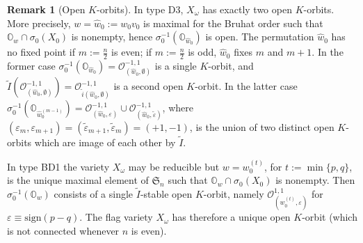 \documentclass{amsart}
\theoremstyle{definition}
\newtheorem{remark}{Remark}
\begin{document}
\begin{remark}[Open $K$-orbits]
In type D3, 
$X_\omega$ has exactly two open $K$-orbits.
More precisely, $w=\hat{w}_0:=w_0v_0$
is maximal for the Bruhat order such that $\mathbb{O}_w\cap\sigma_0(X_0)$ is nonempty,
hence $\sigma_0^{-1}(\mathbb{O}_{\hat{w}_0})$ is open.
The permutation $\hat{w}_0$ has no fixed point if $m:=\frac{n}{2}$ is even; if $m:=\frac{n}{2}$ is odd, $\hat{w}_0$ fixes $m$ and $m+1$.
In the former case
$\sigma_0^{-1}(\mathbb{O}_{\hat{w}_0})=\mathcal{O}^{-1,1}_{(\hat{w}_0,\emptyset)}$
is a single $K$-orbit, and
$\tilde{I}(\mathcal{O}^{-1,1}_{(\hat{w}_0,\emptyset)})=\mathcal{O}^{-1,1}_{\tilde{i}(\hat{w}_0,\emptyset)}$
is a second open $K$-orbit.
In the latter case
$\sigma_0^{-1}(\mathbb{O}_{\hat{w}_0^{(m-1)}})=\mathcal{O}^{-1,1}_{(\hat{w}_0,\varepsilon)}\cup\mathcal{O}^{-1,1}_{(\hat{w}_0,\tilde\varepsilon)}$, where $(\varepsilon_m,\varepsilon_{m+1})=(\tilde\varepsilon_{m+1},\tilde\varepsilon_m)=(+1,-1)$, is the union of two distinct open $K$-orbits
which are image of each other by $\tilde{I}$.

In type BD1 the variety $X_\omega$ may be reducible
but $w=w^{(t)}_0$, for $t:=\min\{p,q\}$, is the unique maximal element of $\mathfrak{S}_n$ 
such that $\mathbb{O}_w\cap\sigma_0(X_0)$ is nonempty.
Then $\sigma_0^{-1}(\mathbb{O}_w)$
consists of a single $\tilde{I}$-stable open $K$-orbit, namely
$\mathcal{O}^{1,1}_{(w^{(t)}_0,\varepsilon)}$ for $\varepsilon\equiv\mathrm{sign}(p-q)$. 
The flag variety $X_\omega$ has therefore a unique open $K$-orbit (which is not connected whenever $n$ is even).
\end{remark}
\end{document}
